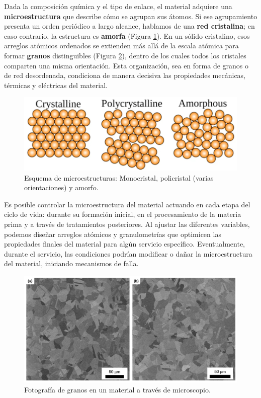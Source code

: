 Dada la composición química y el tipo de enlace, el material adquiere una \textbf{microestructura} que describe cómo se agrupan sus átomos. Si ese agrupamiento presenta un orden periódico a largo alcance, hablamos de una \textbf{red cristalina}; en caso contrario, la estructura es \textbf{amorfa} (Figura \ref{cris}). En un sólido cristalino, esos arreglos atómicos ordenados se extienden más allá de la escala atómica para formar \textbf{granos} distinguibles (Figura \ref{mic}), dentro de los cuales todos los cristales comparten una misma orientación. Esta organización, sea en forma de granos o de red desordenada, condiciona de manera decisiva las propiedades mecánicas, térmicas y eléctricas del material.

\begin{figure}[h!]
    \centering
    \includegraphics[width=0.9\linewidth]{imgs/crist.png}
    \caption{Esquema de microestructuras: Monocristal, policristal (varias orientaciones) y amorfo.}
    \label{cris}
\end{figure}

Es posible controlar la microestructura del material actuando en cada etapa del ciclo de vida: durante su formación inicial, en el procesamiento de la materia prima y a través de tratamientos posteriores. Al ajustar las diferentes variables, podemos diseñar arreglos atómicos y granulometrías que optimicen las propiedades finales del material para algún servicio específico. Eventualmente, durante el servicio, las condiciones podrían modificar o dañar la microestructura del material, iniciando mecanismos de falla.

\begin{figure}[h!]
    \centering
    \includegraphics[width=0.9\linewidth]{imgs/micr.png}
    \caption{Fotografía de granos en un material a través de microscopio.}
    \label{mic}
\end{figure}

